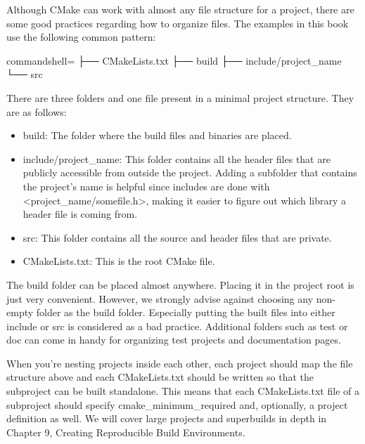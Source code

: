 Although CMake can work with almost any file structure for a project, there are some good practices regarding how to organize files. The examples in this book use the following common pattern:

\begin{tcblisting}{commandshell={}}
├── CMakeLists.txt
├── build
├── include/project_name
└── src
\end{tcblisting}

There are three folders and one file present in a minimal project structure. They are as follows:

\begin{itemize}
\item 
build: The folder where the build files and binaries are placed.

\item 
include/project\_name: This folder contains all the header files that are publicly accessible from outside the project. Adding a subfolder that contains the project's name is helpful since includes are done with <project\_name/somefile.h>, making it easier to figure out which library a header file is coming from.

\item 
src: This folder contains all the source and header files that are private.

\item 
CMakeLists.txt: This is the root CMake file.
\end{itemize}

The build folder can be placed almost anywhere. Placing it in the project root is just very convenient. However, we strongly advise against choosing any non-empty folder as the build folder. Especially putting the built files into either include or src is considered as a bad practice. Additional folders such as test or doc can come in handy for organizing test projects and documentation pages.


When you're nesting projects inside each other, each project should map the file structure above and each CMakeLists.txt should be written so that the subproject can be built standalone. This means that each CMakeLists.txt file of a subproject should specify cmake\_minimum\_required and, optionally, a project definition as well. We will cover large projects and superbuilds in depth in Chapter 9, Creating Reproducible Build Environments.

